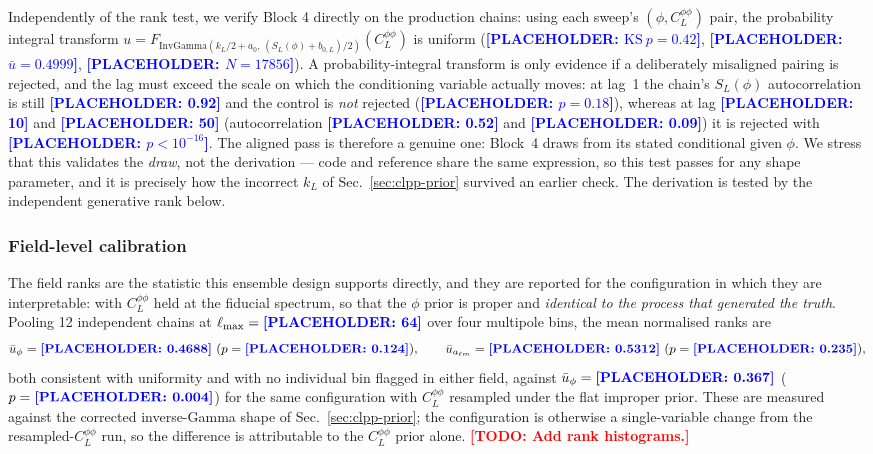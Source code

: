 \documentclass[twocolumn,superscriptaddress,aps,prl,floatfix]{revtex4-2}
\newcommand{\alm}{a_{\ell m}}
\newcommand{\clpp}{C_L^{\phi\phi}}
\newcommand{\lmax}{\ell_{\max}}
\newcommand{\todo}[1]{\textcolor{red}{\textbf{[TODO: #1]}}}
\newcommand{\placeholder}[1]{\textcolor{blue}{\textbf{[PLACEHOLDER: #1]}}}
\begin{document}
Independently of the rank test, we verify Block 4 directly on the production
chains: using each sweep's $(\phi, \clpp)$ pair, the probability integral
transform $u = F_{\mathrm{InvGamma}(k_L/2 + a_0,\,(S_L(\phi)+b_{0,L})/2)}(\clpp)$
is uniform (\placeholder{$\mathrm{KS}\ p = 0.42$}, \placeholder{$\bar u = 0.4999$},
\placeholder{$N = 17856$}). A probability-integral transform is only evidence
if a deliberately misaligned pairing is rejected, and the lag must exceed the
scale on which the conditioning variable actually moves: at lag~1 the chain's
$S_L(\phi)$ autocorrelation is still \placeholder{0.92} and the control is
\emph{not} rejected (\placeholder{$p = 0.18$}), whereas at lag
\placeholder{10} and \placeholder{50} (autocorrelation \placeholder{0.52} and
\placeholder{0.09}) it is rejected with \placeholder{$p < 10^{-16}$}. The
aligned pass is therefore a genuine one: Block~4 draws from its stated
conditional given $\phi$. We stress that this validates the \emph{draw}, not
the derivation --- code and reference share the same expression, so this test
passes for any shape parameter, and it is precisely how the incorrect $k_L$ of
Sec.~\ref{sec:clpp-prior} survived an earlier check. The derivation is tested
by the independent generative rank below.

\subsubsection*{Field-level calibration}

The field ranks are the statistic this ensemble design supports directly, and
they are reported for the configuration in which they are interpretable: with
$\clpp$ held at the fiducial spectrum, so that the $\phi$ prior is proper and
\emph{identical to the process that generated the truth}. Pooling 12
independent chains at $\lmax = \placeholder{64}$ over four multipole bins, the
mean normalised ranks are
\begin{equation*}
  \bar u_{\phi} = \placeholder{0.4688}\ (p = \placeholder{0.124}), \qquad
  \bar u_{\alm} = \placeholder{0.5312}\ (p = \placeholder{0.235}),
\end{equation*}
both consistent with uniformity and with no individual bin flagged in either
field, against $\bar u_\phi = \placeholder{0.367}$
($p = \placeholder{0.004}$) for the same configuration with $\clpp$ resampled
under the flat improper prior. These are measured against the corrected
inverse-Gamma shape of Sec.~\ref{sec:clpp-prior}; the configuration is
otherwise a single-variable change from the resampled-$\clpp$ run, so the
difference is attributable to the $\clpp$ prior alone.
\todo{Add rank histograms.}
\end{document}
